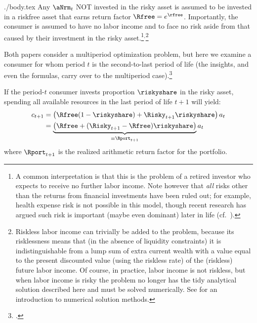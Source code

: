 \documentclass{\handout}
\begin{document}
\begin{verbatimwrite}{./body.tex}
Any $\aNrm_{t}$ NOT invested in the risky asset is assumed to be invested in a riskfree asset that earns return factor
  $\Rfree=e^{\rfree}$.  Importantly, the consumer is assumed to have
  no labor income and to face no risk aside from that caused by their investment in
  the risky asset.\footnote{A common interpretation is that this is
    the problem of a retired investor who expects to receive no
    further labor income.  Note however that {\it all} risks other
    than the returns from financial investments have been ruled out;
    for example, health expense risk is not possible in this model,
    though recent research has argued such risk is important (maybe even dominant) later in
    life (cf.\ \cite{aclvJoy}).}$^{,}$\footnote{Riskless labor income can trivially be added
    to the problem, because its risklessness means that (in the
    absence of liquidity constraints) it is indistinguishable from a
    lump sum of extra current wealth with a value equal to the present
    discounted value (using the riskless rate) of the (riskless)
    future labor income.  Of course, in practice, labor income is not
    riskless, but when labor income is risky the problem no longer has
    the tidy analytical solution described here and must be solved
    numerically.  See \cite{SolvingMicroDSOPs} for an introduction to
    numerical solution methods.}

Both papers consider a multiperiod optimization problem, but here we
examine a consumer for whom period $t$ is the
second-to-last period of life (the insights, and even the formulas,
carry over to the multiperiod case).\footnote{\cite{samuelson1979we}.}

If the period-$t$ consumer invests proportion $\riskyshare$ in the risky asset, 
spending all available resources in the last period of life $t+1$ will yield:
\begin{equation}\begin{gathered}\begin{aligned}
        c_{t+1} & =  \left(\Rfree(1-\riskyshare)+\Risky_{t+1}\riskyshare\right)a_{t} \notag
\\ & =  \underbrace{\left(\Rfree+(\Risky_{t+1}-\Rfree)\riskyshare\right)}_{\equiv \Rport_{t+1}}a_{t} \label{eq:RportDef}
\end{aligned}\end{gathered}\end{equation}
where $\Rport_{t+1}$ is the realized arithmetic %
return factor for the portfolio.


\end{verbatimwrite}
\end{document}
